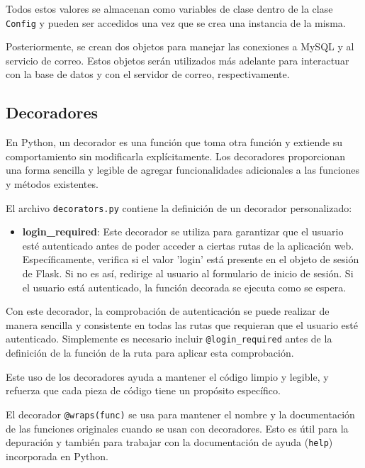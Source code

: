 \documentclass[a4paper, 12pt]{book}
\begin{document}
Todos estos valores se almacenan como variables de clase dentro de la clase \texttt{Config} y pueden ser accedidos una vez que se crea una instancia de la misma.

Posteriormente, se crean dos objetos para manejar las conexiones a MySQL y al servicio de correo. Estos objetos serán utilizados más adelante para interactuar con 
la base de datos y con el servidor de correo, respectivamente.

\subsection{Decoradores}
\label{subsec:decoradores}

En Python, un decorador es una función que toma otra función y extiende su comportamiento sin modificarla explícitamente. Los decoradores proporcionan una forma 
sencilla y legible de agregar funcionalidades adicionales a las funciones y métodos existentes.

El archivo \texttt{decorators.py} contiene la definición de un decorador personalizado:

\begin{itemize}
    \item \textbf{login\_required}: Este decorador se utiliza para garantizar que el usuario esté autenticado antes de poder acceder a ciertas rutas de la aplicación web. 
    Específicamente, verifica si el valor 'login' está presente en el objeto de sesión de Flask. Si no es así, redirige al usuario al formulario de inicio de sesión. 
    Si el usuario está autenticado, la función decorada se ejecuta como se espera.
\end{itemize}

Con este decorador, la comprobación de autenticación se puede realizar de manera sencilla y consistente en todas las rutas que requieran que el usuario esté autenticado. 
Simplemente es necesario incluir \texttt{@login\_required} antes de la definición de la función de la ruta para aplicar esta comprobación.

Este uso de los decoradores ayuda a mantener el código limpio y legible, y refuerza que cada pieza de código tiene un propósito específico.

El decorador \texttt{@wraps(func)} se usa para mantener el nombre y la documentación de las funciones originales cuando se usan con decoradores. Esto es útil para la 
depuración y también para trabajar con la documentación de ayuda (\texttt{help}) incorporada en Python.
\end{document}
